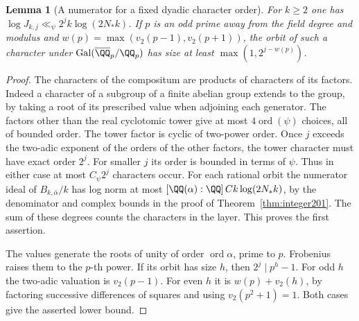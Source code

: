 \documentclass[a4paper,11pt]{article}
\newtheorem{lemma}[proposition]{Lemma}
\theoremstyle{definition}
\theoremstyle{remark}
\numberwithin{equation}{section}
\begin{document}
\begin{lemma}[A numerator for a fixed dyadic character order]
\label{lem:orbits233}
For \(k\ge2\) one has
\(\log J_{k,j}\ll_\psi 2^j k\log(2N_* k)\). If \(p\) is an odd
prime away from the field degree and modulus and
\(w(p)=\max(v_2(p-1),v_2(p+1))\), the orbit of such a character under
\(\operatorname{Gal}(\overline{\QQ}_p/\QQ_p)\) has size at least
\(\max(1,2^{j-w(p)})\).
\end{lemma}
\begin{proof}
The characters of the compositum are products of characters of its
factors. Indeed a character of a subgroup of a finite abelian group
extends to the group, by taking a root of its prescribed value when
adjoining each generator. The factors other than the real cyclotomic
tower give at most \(4\operatorname{ord}(\psi)\) choices, all of
bounded order. The tower factor is cyclic of two-power order.
Once \(j\) exceeds the two-adic exponent of the orders of the other
factors, the tower character must have exact order \(2^j\). For
smaller \(j\) its order is bounded in terms of \(\psi\). Thus in
either case at most \(C_\psi 2^j\) characters occur. For each rational
orbit the numerator ideal of \(B_{k,\bar\alpha}/k\) has log norm at
most \([\QQ(\alpha):\QQ]\,Ck\log(2N_*k)\), by the denominator and
complex bounds in the proof of Theorem~\ref{thm:integer201}.
The sum of these degrees counts the characters in the layer. This
proves the first assertion.

The values generate the roots of unity of order \(\operatorname{ord}\alpha\),
prime to \(p\). Frobenius raises them to the \(p\)-th power. If its
orbit has size \(h\), then \(2^j\mid p^h-1\). For odd \(h\) the
two-adic valuation is \(v_2(p-1)\). For even \(h\) it is
\(w(p)+v_2(h)\), by factoring successive differences of squares and
using \(v_2(p^2+1)=1\). Both cases give the asserted lower bound.
\end{proof}
\end{document}
